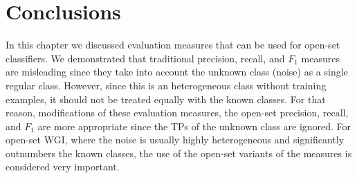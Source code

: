 




\section{Conclusions}

In this chapter we discussed evaluation measures that can be used for open-set classifiers. We demonstrated that traditional precision, recall, and $F_{1}$ measures are misleading since they take into account the unknown class (noise) as a single regular class. However, since this is an heterogeneous class without training examples, it should not be treated equally with the known classes. For that reason, modifications of these evaluation measures, the open-set precision, recall, and $F_{1}$ are more appropriate since the TPs of the unknown class are ignored. For open-set WGI, where the noise is usually highly heterogeneous and significantly outnumbers the known classes, the use of the open-set variants of the measures is considered very important.


